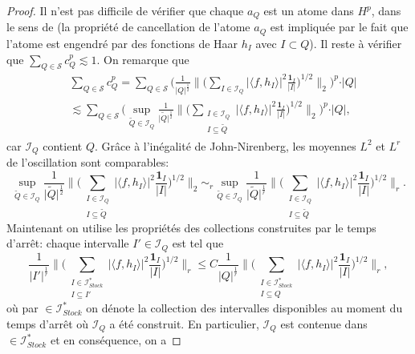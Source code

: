 \documentclass[11pt]{amsart}
\newcommand{\one}{\mathbf{1}}
\newcommand{\ii}{\mathscr}
\newcommand{\ic}{\mathcal}
\begin{document}
\begin{proof}
Il n'est pas difficile de v\'erifier que chaque $a_Q$ est un atome dans $H^p$, dans le sens de \cite{TreesBMOCarlesonMeasures} (la propri\'et\'e de cancellation de l'atome $a_Q$ est impliqu\'ee par le fait que l'atome est engendr\'e par des fonctions de Haar $h_I$ avec $I\subset Q$). Il reste \`a v\'erifier que $\sum_{Q \in \ic S}c_Q^p \lesssim 1$. On remarque que 
\begin{align*}
&\sum_{Q \in \ic S} c_Q^p =\sum_{Q \in \ic S} \Big( \frac{1}{\vert Q \vert^{\frac{1}{2}}} \big\| \big(  \sum_{ I \in \ii I_Q}  \vert \langle f, h_I  \rangle \vert^2 \frac{\one_I}{\vert I \vert} \big)^{1/2}  \big\|_2  \Big)^p \cdot \vert Q\vert \\
& \lesssim \sum_{Q \in \ic S } \Big( \sup_{ \tilde Q \in \ii I_Q} \frac{1}{\vert \tilde  Q \vert^{\frac{1}{2}}} \big\| \big(  \sum_{\substack{ I \in \ii I_Q \\ I \subseteq \tilde Q}}  \vert \langle f, h_I  \rangle \vert^2 \frac{\one_I}{\vert I \vert} \big)^{1/2}  \big\|_2  \Big)^p \cdot \vert Q \vert,
\end{align*}
car $\ii I_Q$ contient $Q$.
Gr\^ace \`a l'in\'egalit\'e de John-Nirenberg, les moyennes $L^2$ et $L^r$ de l'oscillation sont comparables:
\[
\sup_{ \tilde Q \in \ii I_Q} \frac{1}{\vert \tilde  Q \vert^{\frac{1}{2}}} \big\| \big(  \sum_{\substack{ I \in \ii I_Q \\ I \subseteq \tilde Q}}  \vert \langle f, h_I  \rangle \vert^2 \frac{\one_I}{\vert I \vert} \big)^{1/2}  \big\|_2 \sim _{r} \sup_{ \tilde Q \in \ii I_Q} \frac{1}{\vert \tilde  Q \vert^{\frac{1}{r}}} \big\| \big(  \sum_{\substack{ I \in \ii I_Q \\ I \subseteq \tilde Q}}  \vert \langle f, h_I  \rangle \vert^2 \frac{\one_I}{\vert I \vert} \big)^{1/2}  \big\|_r.
\]
Maintenant on utilise les propri\'et\'es des collections construites par le temps d'arr\^et: chaque intervalle $I' \in \ii I_Q$ est tel que
\[
\frac{1}{\vert I' \vert^{\frac{1}{r}}} \big\| \big(  \sum_{\substack{ I \in \ii I_{Stock}^* \\ I \subseteq I'}}  \vert \langle f, h_I  \rangle \vert^2 \frac{\one_I}{\vert I \vert} \big)^{1/2}  \big\|_r \leq C \frac{1}{\vert   Q \vert^{\frac{1}{r}}} \big\| \big(  \sum_{\substack{ I \in \ii I_{Stock}^* \\ I \subseteq  Q}}  \vert \langle f, h_I  \rangle \vert^2 \frac{\one_I}{\vert I \vert} \big)^{1/2}  \big\|_r,
\]
o\`u par $\in \ii I_{Stock}^*$ on d\'enote la collection des intervalles disponibles au moment du temps d'arr\^et o\`u $\ii I_Q$ a \'et\'e construit. En particulier, $\ii I_Q$ est contenue dans $\in \ii I_{Stock}^*$ et en cons\'equence, on a

\end{proof}
\end{document}

